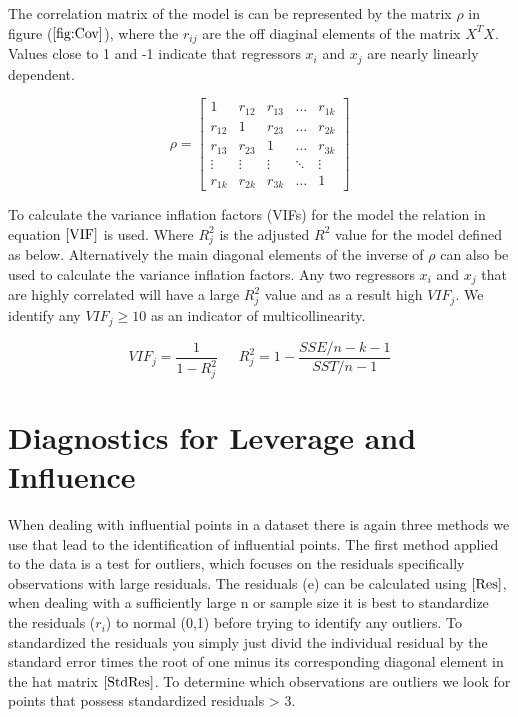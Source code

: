 \documentclass[12pt]{report}
\begin{document}
The correlation matrix of the model is can be represented by the matrix $\rho$ in figure ($\ref{fig:Cov}$), where the $r_{ij}$ are the off diaginal elements of the matrix $X^{T}X$. Values close to 1 and -1 indicate that regressors $x_i$ and $x_j$ are nearly linearly dependent. 

\begin{equation}
\rho = 
    \begin{bmatrix} \label{fig:Cov}
    1      & r_{12}     & r_{13} & \dots  & r_{1k}\\
    r_{12} & 1          & r_{23} & \dots  & r_{2k}\\
    r_{13} & r_{23}     & 1      & \dots  & r_{3k}\\
    \vdots & \vdots     & \vdots & \ddots & \vdots \\
    r_{1k} & r_{2k}     & r_{3k} & \dots  & 1
\end{bmatrix}
\end{equation}

To calculate the variance inflation factors (VIFs) for the model the relation in equation $\eqref{VIF}$ is used. Where $R_{j}^2$ is the adjusted $R^2$ value for the model defined as below. Alternatively the main diagonal elements of the inverse of $\rho$ can also be used to calculate the variance inflation factors. Any two regressors $x_i$ and $x_j$ that are highly correlated will have a large $R_{j}^2$ value and as a result high $VIF_j$. We identify any $VIF_j \geq 10$ as an indicator of multicollinearity.

\begin{equation} \label{VIF}
    VIF_{j} = \frac{1}{1 - R_{j}^2} \phantom{333} 
    R_{j}^2 = 1 - \frac{{SSE}/{n - k - 1}}{{SST}/{n - 1}}
\end{equation}

\section{Diagnostics for Leverage and Influence}
When dealing with influential points in a dataset there is again three methods we use that lead to the identification of influential points. The first method applied to the data is a test for outliers, which focuses on the residuals specifically observations with large residuals. The residuals (e) can be calculated using $\eqref{Res}$, when dealing with a sufficiently large n or sample size it is best to standardize the residuals ($r_{i}$) to normal (0,1) before trying to identify any outliers. To standardized the residuals you simply just divid the individual residual by the standard error times the root of one minus its corresponding diagonal element in the hat matrix $\eqref{StdRes}$. To determine which observations are outliers we look for points that possess standardized residuals > 3.
\end{document}
